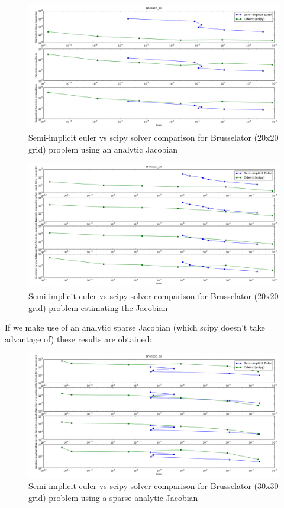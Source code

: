 \documentclass[12pt]{article}
\begin{document}
\begin{figure}[h]
 \includegraphics[scale=0.3]{implicit_images/Bruss20_ng.png}
\centering
\caption{Semi-implicit euler vs scipy solver comparison for Brusselator (20x20 grid) problem using an analytic Jacobian}
\end{figure}

\begin{figure}[h]
 \includegraphics[scale=0.3]{implicit_images/Bruss20_g_fulljac.png}
\centering
\caption{Semi-implicit euler vs scipy solver comparison for Brusselator (20x20 grid) problem estimating the Jacobian}
\end{figure}

If we make use of an analytic sparse Jacobian (which scipy doesn't take advantage of) these results are obtained:

\begin{figure}[h]
 \includegraphics[scale=0.3]{implicit_images/Bruss30_g_sparsejac.png}
\centering
\caption{Semi-implicit euler vs scipy solver comparison for Brusselator (30x30 grid) problem using a sparse analytic Jacobian}
\end{figure}
\end{document}
